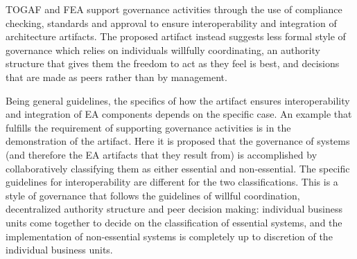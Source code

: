 TOGAF and FEA support governance activities through the use of compliance checking, standards and approval to ensure interoperability and integration of architecture artifacts. The proposed artifact instead suggests less formal style of governance which relies on individuals willfully coordinating, an authority structure that gives them the freedom to act as they feel is best, and decisions that are made as peers rather than by management.

Being general guidelines, the specifics of how the artifact ensures interoperability and integration of EA components depends on the specific case. An example that fulfills the requirement of supporting governance activities is in the demonstration of the artifact. Here it is proposed that the governance of systems (and therefore the EA artifacts that they result from) is accomplished by collaboratively classifying them as either essential and non-essential. The specific guidelines for interoperability are different for the two classifications. This is a style of governance that follows the guidelines of willful coordination, decentralized authority structure and peer decision making: individual business units come together to decide on the classification of essential systems, and the implementation of non-essential systems is completely up to discretion of the individual business units. 
